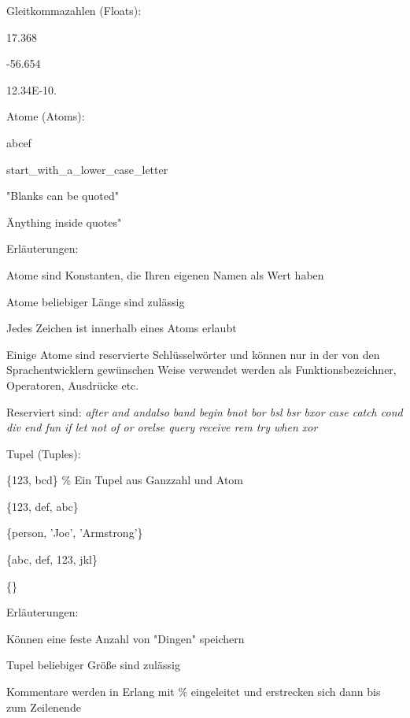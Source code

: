 \documentclass[10pt]{article}
\begin{document}
Gleitkommazahlen (Floats):
\begin{itemize*}
  \item 17.368
  \item -56.654
  \item 12.34E-10.
\end{itemize*}

Atome (Atoms):
\begin{itemize*}
  \item abcef
  \item start\_with\_a\_lower\_case\_letter
  \item "Blanks can be quoted"
  \item \"Anything inside quotes"
  \item Erläuterungen:
  \begin{itemize*}
    \item Atome sind Konstanten, die Ihren eigenen Namen als Wert haben
    \item Atome beliebiger Länge sind zulässig
    \item Jedes Zeichen ist innerhalb eines Atoms erlaubt
    \item Einige Atome sind reservierte Schlüsselwörter und können nur in der von den Sprachentwicklern gewünschen Weise verwendet werden als Funktionsbezeichner, Operatoren, Ausdrücke etc.
    \item Reserviert sind: \textit{after and andalso band begin bnot bor bsl bsr bxor case catch cond div end fun if let not of or orelse query receive rem try when xor}
  \end{itemize*}
\end{itemize*}

Tupel (Tuples):
\begin{itemize*}
  \item \{123, bcd\} \% Ein Tupel aus Ganzzahl und Atom
  \item \{123, def, abc\}
  \item \{person, 'Joe', 'Armstrong'\}
  \item \{abc, {def, 123}, jkl\}
  \item \{\}
  \item Erläuterungen:
  \begin{itemize*}
    \item Können eine feste Anzahl von "Dingen" speichern
    \item Tupel beliebiger Größe sind zulässig
    \item Kommentare werden in Erlang mit \% eingeleitet und erstrecken sich dann bis zum Zeilenende
  \end{itemize*}
\end{itemize*}
\end{document}
